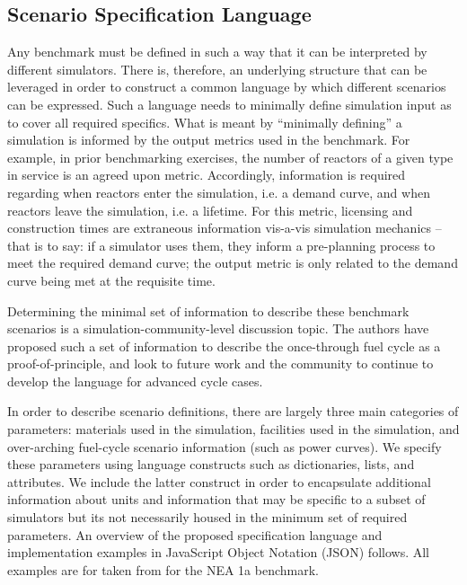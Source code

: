 \documentclass{anstrans}
\begin{document}
\subsection{Scenario Specification Language}
Any benchmark must be defined in such a way that it can be interpreted by
different simulators. There is, therefore, an underlying structure that can be
leveraged in order to construct a common language by which different scenarios
can be expressed. Such a language needs to minimally define simulation input as
to cover all required specifics. What is meant by ``minimally defining'' a
simulation is informed by the output metrics used in the benchmark. For example,
in prior benchmarking exercises, the number of reactors of a given type in
service is an agreed upon metric. Accordingly, information is required regarding
when reactors enter the simulation, i.e. a demand curve, and when reactors leave
the simulation, i.e. a lifetime. For this metric, licensing and construction
times are extraneous information vis-a-vis simulation mechanics -- that is to
say: if a simulator uses them, they inform a pre-planning process to meet the
required demand curve; the output metric is only related to the demand curve
being met at the requisite time.

Determining the minimal set of information to describe these benchmark scenarios
is a simulation-community-level discussion topic. The authors have proposed such
a set of information to describe the once-through fuel cycle as a
proof-of-principle, and look to future work and the community to continue to
develop the language for advanced cycle cases. 

In order to describe scenario definitions, there are largely three main
categories of parameters: materials used in the simulation, facilities used in
the simulation, and over-arching fuel-cycle scenario information (such as power
curves). We specify these parameters using language constructs such as
dictionaries, lists, and attributes. We include the latter construct in order to
encapsulate additional information about units and information that may be
specific to a subset of simulators but its not necessarily housed in the minimum
set of required parameters. An overview of the proposed specification
language and implementation examples in JavaScript Object Notation
(JSON)\cite{_json_2001} follows. All examples are for taken from for the NEA 1a
benchmark\cite{boucher_specification_2008}.
\end{document}
